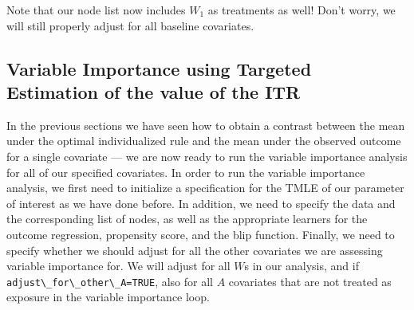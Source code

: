 \documentclass[
  12pt, krantz2,
]{krantz}
\newcommand{\passthrough}[1]{#1}
\theoremstyle{definition}
\theoremstyle{definition}
\theoremstyle{definition}
\newcommand{\1}{\mathbbm{1}}
\begin{document}
Note that our node list now includes \(W_1\) as treatments as well! Don't worry,
we will still properly adjust for all baseline covariates.

\hypertarget{variable-importance-using-targeted-estimation-of-the-value-of-the-itr}{%
\subsection{Variable Importance using Targeted Estimation of the value of the ITR}\label{variable-importance-using-targeted-estimation-of-the-value-of-the-itr}}

In the previous sections we have seen how to obtain a contrast between the mean
under the optimal individualized rule and the mean under the observed outcome
for a single covariate --- we are now ready to run the variable importance analysis
for all of our specified covariates. In order to run the variable importance
analysis, we first need to initialize a specification for the TMLE of our
parameter of interest as we have done before. In addition, we need to specify
the data and the corresponding list of nodes, as well as the appropriate
learners for the outcome regression, propensity score, and the blip function.
Finally, we need to specify whether we should adjust for all the other
covariates we are assessing variable importance for. We will adjust for all \(W\)s
in our analysis, and if \passthrough{\lstinline!adjust\_for\_other\_A=TRUE!}, also for all \(A\) covariates
that are not treated as exposure in the variable importance loop.
\end{document}

